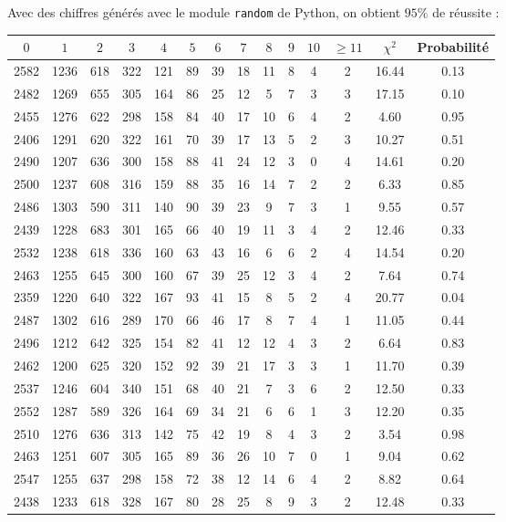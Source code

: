 \documentclass[12pt,a4paper]{article}
\begin{document}
\newpage
Avec des chiffres générés avec le module \texttt{random} de Python,
on obtient $95\%$ de réussite :
\begin{center}
\begin{tabular}{|c|c|c|c|c|c|c|c|c|c|c|c|c|c|}
\hline
$0$ & $1$ & $2$ & $3$ & $4$ & $5$ & $6$ & $7$ & $8$ & $9$ & $10$ & $\geq 11$ & $\chi^2$ & Probabilité \\ \hline
2582 & 1236 & 618 & 322 & 121 & 89 & 39 & 18 & 11 & 8 & 4 & 2 & 16.44 &  0.13\\ \hline
2482 & 1269 & 655 & 305 & 164 & 86 & 25 & 12 & 5 & 7 & 3 & 3 & 17.15 &  0.10\\ \hline
2455 & 1276 & 622 & 298 & 158 & 84 & 40 & 17 & 10 & 6 & 4 & 2 &  4.60 &  0.95\\ \hline
2406 & 1291 & 620 & 322 & 161 & 70 & 39 & 17 & 13 & 5 & 2 & 3 & 10.27 &  0.51\\ \hline
2490 & 1207 & 636 & 300 & 158 & 88 & 41 & 24 & 12 & 3 & 0 & 4 & 14.61 &  0.20\\ \hline
2500 & 1237 & 608 & 316 & 159 & 88 & 35 & 16 & 14 & 7 & 2 & 2 &  6.33 &  0.85\\ \hline
2486 & 1303 & 590 & 311 & 140 & 90 & 39 & 23 & 9 & 7 & 3 & 1 &  9.55 &  0.57\\ \hline
2439 & 1228 & 683 & 301 & 165 & 66 & 40 & 19 & 11 & 3 & 4 & 2 & 12.46 &  0.33\\ \hline
2532 & 1238 & 618 & 336 & 160 & 63 & 43 & 16 & 6 & 6 & 2 & 4 & 14.54 &  0.20\\ \hline
2463 & 1255 & 645 & 300 & 160 & 67 & 39 & 25 & 12 & 3 & 4 & 2 &  7.64 &  0.74\\ \hline
2359 & 1220 & 640 & 322 & 167 & 93 & 41 & 15 & 8 & 5 & 2 & 4 & 20.77 &  0.04\\ \hline
2487 & 1302 & 616 & 289 & 170 & 66 & 46 & 17 & 8 & 7 & 4 & 1 & 11.05 &  0.44\\ \hline
2496 & 1212 & 642 & 325 & 154 & 82 & 41 & 12 & 12 & 4 & 3 & 2 &  6.64 &  0.83\\ \hline
2462 & 1200 & 625 & 320 & 152 & 92 & 39 & 21 & 17 & 3 & 3 & 1 & 11.70 &  0.39\\ \hline
2537 & 1246 & 604 & 340 & 151 & 68 & 40 & 21 & 7 & 3 & 6 & 2 & 12.50 &  0.33\\ \hline
2552 & 1287 & 589 & 326 & 164 & 69 & 34 & 21 & 6 & 6 & 1 & 3 & 12.20 &  0.35\\ \hline
2510 & 1276 & 636 & 313 & 142 & 75 & 42 & 19 & 8 & 4 & 3 & 2 &  3.54 &  0.98\\ \hline
2463 & 1251 & 607 & 305 & 165 & 89 & 36 & 26 & 10 & 7 & 0 & 1 &  9.04 &  0.62\\ \hline
2547 & 1255 & 637 & 298 & 158 & 72 & 38 & 12 & 14 & 6 & 4 & 2 &  8.82 &  0.64\\ \hline
2438 & 1233 & 618 & 328 & 167 & 80 & 28 & 25 & 8 & 9 & 3 & 2 & 12.48 &  0.33\\ \hline
\end{tabular}
\end{center}
\end{document}
